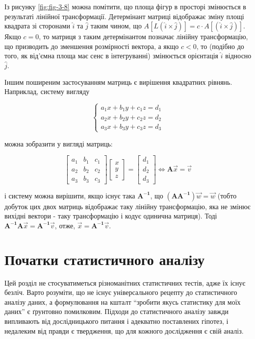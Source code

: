 \documentclass[
  11pt,
]{book}
\begin{document}
Із рисунку \ref{fig:fig-3-8} можна помітити, що площа фігур в просторі змінюється в результаті лінійної трансформації. Детермінант матриці відображає зміну площі квадрата зі сторонами \(\hat{i}\) та \(\hat{j}\) таким чином, що \(A[L(\hat{i} \times \hat{j})] = c \cdot A[(\hat{i} \times \hat{j})]\). Якщо \(c = 0\), то матриця з таким детермінантом позначає лінійну трансформацію, що призводить до зменшення розмірності вектора, а якщо \(c<0\), то (подібно до того, як від'ємна площа має сенс в інтегруванні) змінюється орієнтація \(\hat{i}\) відносно \(\hat{j}\).

Іншим поширеним застосуванням матриць є вирішення квадратних рівнянь. Наприклад, систему вигляду

\[\begin{cases}
a_1 x + b_1 y + c_1 z = d_1 \\
a_2 x + b_2 y + c_2 z = d_2 \\
a_3 x + b_3 y + c_3 z = d_3
\end{cases}\]

можна зобразити у вигляді матриць:

\[\begin{bmatrix}
a_1 & b_1 & c_1 \\
a_2 & b_2 & c_2 \\
a_3 & b_3 & c_3
\end{bmatrix}
\begin{bmatrix}
x \\
y \\
z
\end{bmatrix} = 
\begin{bmatrix}
d_1 \\
d_2 \\
d_3
\end{bmatrix} \iff \mathbf{A} \vec{x} = \vec{v}\]

і систему можна вирішити, якщо існує така \(\mathbf{A^{-1}}\), що \((\mathbf{AA^{-1}}) \vec{w} = \vec{w}\) (тобто добуток цих двох матриць відображає таку лінійну трансформацію, яка не змінює вихідні вектори - таку трансформацію і кодує одинична матриця). Тоді \(\mathbf{A^{-1} A} \vec{x} = \mathbf{A^{-1}} \vec{v}\), отже, \(\vec{x} = \mathbf{A^{-1}} \vec{v}\).

\section{Початки статистичного аналізу}\label{stats}

Цей розділ не стосуватиметься різноманітних статистичних тестів, адже їх існує безліч. Варто розуміти, що не існує універсального рецепту до статистичного аналізу даних, а формулювання на кшталт ``зробити якусь статистику для моїх даних'' є ґрунтовно помилковим. Підходи до статистичного аналізу завжди випливають від дослідницького питання і адекватно поставлених гіпотез, і недалеким від правди є твердження, що для кожного дослідження є свій аналіз.
\end{document}
